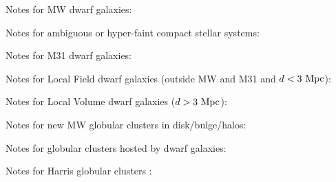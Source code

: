 
Notes for MW dwarf galaxies:
\begin{itemize}



\end{itemize}

Notes for ambiguous or hyper-faint compact stellar systems:
\begin{itemize}



\end{itemize}

Notes for M31 dwarf galaxies:
\begin{itemize}



\end{itemize}


Notes for Local Field  dwarf galaxies (outside MW and M31 and $d < 3~{\rm Mpc}$):
\begin{itemize}



\end{itemize}

Notes for Local Volume  dwarf galaxies ($d > 3~{\rm Mpc}$):
\begin{itemize}



\end{itemize}

Notes for new MW globular clusters  in disk/bulge/halos:
\begin{itemize}



\end{itemize}

Notes for  globular clusters hosted by dwarf galaxies:
\begin{itemize}



\end{itemize}

Notes for Harris globular clusters \citep{Harris1996AJ....112.1487H}:
\begin{itemize}



\end{itemize}
